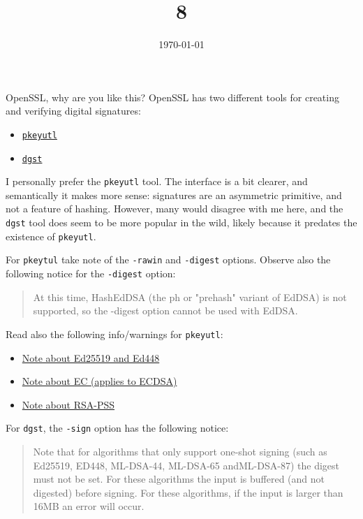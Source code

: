 \documentclass{practice}
\title{8}
\date{\today}
\begin{document}
\maketitle

\begin{task}{OpenSSL, why are you like this?}
  OpenSSL has two different tools for creating and verifying digital signatures:
  \begin{itemize}
    \item \href{https://docs.openssl.org/master/man1/openssl-pkeyutl/}{\texttt{pkeyutl}}
    \item \href{https://docs.openssl.org/master/man1/openssl-dgst/}{\texttt{dgst}}
  \end{itemize}

  I personally prefer the \texttt{pkeyutl} tool.
  The interface is a bit clearer, and semantically it makes more sense: signatures are an asymmetric primitive, and not a feature of hashing.
  However, many would disagree with me here, and the \texttt{dgst} tool does seem to be more popular in the wild, likely because it predates the existence of \texttt{pkeyutl}.

  For \texttt{pkeytul} take note of the \texttt{-rawin} and \texttt{-digest} options.
  Observe also the following notice for the \texttt{-digest} option:
  \begin{quotation}
    At this time, HashEdDSA (the ph or "prehash" variant of EdDSA) is not supported, so the -digest option cannot be used with EdDSA.
  \end{quotation}

  Read also the following info/warnings for \texttt{pkeyutl}:
  \begin{itemize}
    \item \href{https://docs.openssl.org/master/man1/openssl-pkeyutl/#ed25519-and-ed448-algorithms}{Note about Ed25519 and Ed448}
    \item \href{https://docs.openssl.org/master/man1/openssl-pkeyutl/#ec-algorithm}{Note about EC (applies to ECDSA)}
    \item \href{https://docs.openssl.org/master/man1/openssl-pkeyutl/#rsa-pss-algorithm}{Note about RSA-PSS}
  \end{itemize}

  For \texttt{dgst}, the \texttt{-sign} option has the following notice:
  \begin{quotation}
    Note that for algorithms that only support one-shot signing (such as Ed25519, ED448, ML-DSA-44, ML-DSA-65 andML-DSA-87) the digest must not be set. For these algorithms the input is buffered (and not digested) before signing. For these algorithms, if the input is larger than 16MB an error will occur.
  \end{quotation}
\end{task}
\end{document}
